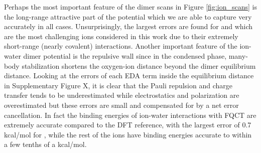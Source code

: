 \documentclass[journal=jctcce,manuscript=article]{achemso}
\begin{document}
Perhaps the most important feature of the dimer scans in Figure \ref{fig:ion_scans} is the long-range attractive part of the potential which we are able to capture very accurately in all cases. Unsurprisingly, the largest errors are found for  and  which are the most challenging ions considered in this work due to their extremely short-range (nearly covalent) interactions. Another important feature of the ion-water dimer potential is the repulsive wall since in the condensed phase, many-body stabilization shortens the oxygen-ion distance beyond the dimer equilibrium distance. Looking at the errors of each EDA term inside the equilibrium distance in Supplementary Figure X, it is clear that the Pauli repulsion and charge transfer tends to be underestimated while electrostatics and polarization are overestimated but these errors are small and compensated for by a net error cancellation. In fact the binding energies of ion-water interactions with FQCT are extremely accurate compared to the DFT reference, with the largest error of 0.7 kcal/mol for , while the rest of the ions have binding energies accurate to within a few tenths of a kcal/mol.
\end{document}
